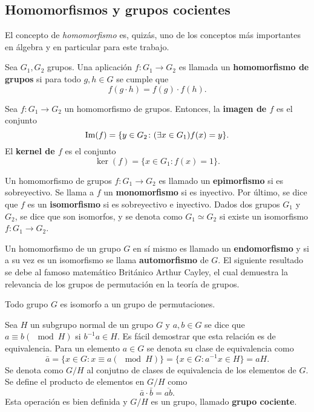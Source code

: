 \subsection{Homomorfismos y grupos cocientes}
El concepto de \textit{homomorfismo} es, quizás, uno de los conceptos más importantes en álgebra y en particular para este trabajo.
\begin{definicion}
Sea $G_1, G_2 $ grupos. Una aplicación $f \colon G_1 \to G_2$ es llamada un \textbf{homomorfismo de grupos} si para todo $g, h \in G$ se cumple que \[ f(g \cdot h) = f(g) \cdot f(h) . \]
\end{definicion}
\begin{definicion}
Sea $f \colon G_1 \to G_2$ un homomorfismo de grupos. Entonces, la \textbf{imagen de $f$} es el conjunto \[ \operatorname{Im}(f) = \{ y \in G_2 \colon (\exists x \in G_1)f(x) =y \}. \]
El \textbf{kernel de $f$} es el conjunto \[ \ker(f) =  \{ x \in G_1 \colon f(x) = 1 \}.\] 
\end{definicion}
\begin{definicion}
Un homomorfismo de grupos $f \colon G_1 \to G_2$ es llamado un \textbf{epimorfismo} si es sobreyectivo. Se llama a $f$ un \textbf{monomorfismo} si es inyectivo. Por último, se dice que $f$ es un  \textbf{isomorfismo} si es sobreyectivo e inyectivo. Dados dos grupos $G_1$ y $G_2$, se dice que son isomorfos, y se denota como $G_1 \simeq G_2$ si existe un isomorfismo $f \colon G_1 \to G_2$. 
\end{definicion} 
Un homomorfismo de un grupo $G$ en sí mismo es llamado un \textbf{endomorfismo} y si a su vez es un isomorfismo se llama  \textbf{automorfismo} de $G$. 
El siguiente resultado se debe al famoso matemático Británico Arthur Cayley, el cual demuestra la relevancia de los grupos de permutación en la teoría de grupos.
\begin{teorema}[Cayley]
Todo grupo $G$ es isomorfo a un grupo de permutaciones.
\end{teorema}
\begin{definicion}
Sea $H$ un subgrupo normal de un grupo $G$ y $a, b \in G$ se dice que $a \equiv b (\mod{H})$ si $b^{-1}a \in H$. Es fácil demostrar que esta relación es de equivalencia. Para un elemento $a \in G$ se denota su clase de equivalencia como \[ \bar{a} = \{ x \in G \colon x \equiv a(\mod{H}) \} = \{ x \in G \colon a^{-1}x \in H \} = aH. \]
Se denota como $G/H$ al conjutno de clases de equivalencia de los elementos de $G$. Se define el producto de elementos en $G/H$ como \[ \bar{a}\cdot \bar{b} = \overline{ab}. \] Esta operación es bien definida y $G/H$ es un grupo, llamado \textbf{grupo cociente}. 
\end{definicion}
